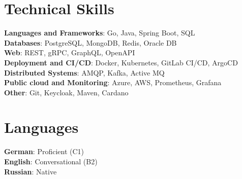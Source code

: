 \documentclass[letterpaper,11pt]{article}
\begin{document}
\begin{minipage}[t]{0.68\textwidth}\vspace{16pt}
    \section{Technical Skills}
    \begin{itemize}[leftmargin=0.15in, label={}]\vspace{-5pt}
        \small{\item{
            \textbf{Languages and Frameworks}{: Go, Java, Spring Boot, SQL} \\
            \textbf{Databases}{: PostgreSQL, MongoDB, Redis, Oracle DB}\\
            \textbf{Web}{: REST, gRPC, GraphQL, OpenAPI}\\
            \textbf{Deployment and CI/CD}{: Docker, Kubernetes, GitLab CI/CD, ArgoCD}\\
            \textbf{Distributed Systems}{: AMQP, Kafka, Active MQ}\\
            \textbf{Public cloud and Monitoring}{: Azure, AWS, Prometheus, Grafana} \\
            \textbf{Other}{: Git, Keycloak, Maven, Cardano} \\
        }}
    \end{itemize}
\end{minipage}
\hfill
\begin{minipage}[t]{0.28\textwidth}\vspace{16pt}
    \section{Languages}
    \begin{itemize}[leftmargin=0.15in, label={}]\vspace{-5pt}
        \small{\item{
            \textbf{German}{: Proficient (C1)} \\
            \textbf{English}{: Conversational (B2)} \\
            \textbf{Russian}{: Native}
        }}
    \end{itemize}
\end{minipage}

\end{document}
